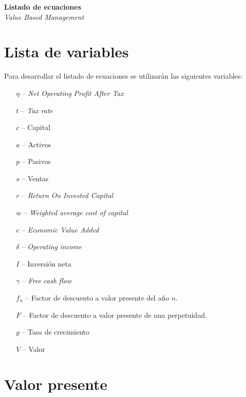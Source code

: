 \begin{center}
    {\huge \textbf{Listado de ecuaciones}}\\
    \vspace{0.5cm}
    {\large \textit{Value Based Management}}
\end{center}


\section{Lista de variables}
Para desarrollar el listado de ecuaciones se utilizarán las siguientes variables:

\begin{itemize}
    \item [$\eta$ \---] \textit{Net Operating Profit After Tax}
    \item [$t$ \---] \textit{Tax rate}
    \item [$c$ \---] Capital
    \item [$a$ \---] Activos
    \item [$p$ \---] Pasivos
    \item [$s$ \---] Ventas
    \item [$r$ \---] \textit{Return On Invested Capital}
    \item [$w$ \---] \textit{Weighted average cost of capital}
    \item [$e$ \---] \textit{Economic Value Added}
    \item [$\delta$ \---] \textit{Operating income}
    \item [$I$ \---] Inversión neta
    \item [$\gamma$ \---] \textit{Free cash flow}
    \item [$f_n$ \---] Factor de descuento a valor presente del año $n$.
    \item [$F$ \---] Factor de descuento a valor presente de una perpetuidad.
    \item [$g$ \---] Tasa de crecimiento
    \item [$V$ \---] Valor
\end{itemize}

\section{Valor presente}


